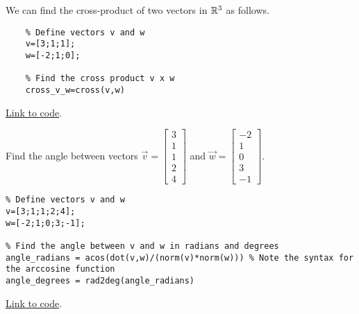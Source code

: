 \documentclass{ximera}
\begin{document}
\begin{template}\label{temp_oct_vec_cross}
We can find the cross-product of two vectors in $\mathbb{R}^3$ as follows.

\begin{verbatim}
    % Define vectors v and w
    v=[3;1;1];
    w=[-2;1;0];
    
    % Find the cross product v x w
    cross_v_w=cross(v,w)
    \end{verbatim}
    
    \href{https://sagecell.sagemath.org/?z=eJxTVXBJTcvMS1UoS00uyS8qVihTSMxLUSjn5SqzjTa2NrQ2jLXm5Sq3jdY1AnIMQBxeLlUFt0ygopKMVIXkovziYoWCovyU0uQSoOYKkFawYHxZfLktmKVRplOuCQBmGSA1&lang=octave&interacts=eJyLjgUAARUAuQ==}{Link to code}.

\end{template}

\begin{example}\label{ex:angleInOctave}
    Find the angle between vectors $\vec{v}=\begin{bmatrix}3\\1\\1\\2\\4\end{bmatrix}$ and $\vec{w}=\begin{bmatrix}-2\\1\\0\\3\\-1\end{bmatrix}$.
    \begin{explanation}
        \begin{verbatim}
% Define vectors v and w
v=[3;1;1;2;4];
w=[-2;1;0;3;-1];

% Find the angle between v and w in radians and degrees
angle_radians = acos(dot(v,w)/(norm(v)*norm(w))) % Note the syntax for the arccosine function
angle_degrees = rad2deg(angle_radians)
        \end{verbatim}

\href{https://sagecell.sagemath.org/?z=eJxVj8EKwjAMhu-DvUMug1Ycus1b2U08-gJDpLaZFjSFtrb69nbTHSSH8Cf5_49UsMfREEJEFazzEEGShlQWsR860eRqxe4kyiL1Q91muRWdqJtpUhYVHEy-DjfMrusd4YIhIdKSAobASW0k-Xmg8eoQfVnM1-dl1YNU1jNtA4vrxDeMrHuwyFdzT5xzqOBoA84k_6YgXzBa9wU7lc3TC-OTVDCWlvgfLcdnUJsV-8PyD0ihUa8=&lang=octave&interacts=eJyLjgUAARUAuQ==}{Link to code}.        
    \end{explanation}
\end{example}
\end{document}
